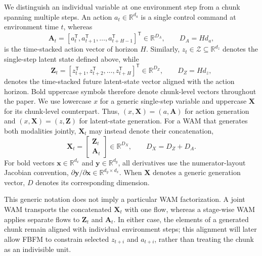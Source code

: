 We distinguish an individual variable at one environment step from a chunk spanning
multiple steps. An action
$a_t\in\mathbb{R}^{d_a}$ is a single control command at environment time $t$,
whereas
\begingroup
\small
\begin{equation}
    \mathbf{A}_t
    = [a_t^{\mathsf T},a_{t+1}^{\mathsf T},\ldots,
       a_{t+H-1}^{\mathsf T}]^{\mathsf T}
    \in\mathbb{R}^{D_A},
    \qquad D_A=H d_a,
    \label{eq:action-chunk}
\end{equation}
\endgroup
is the time-stacked action vector of horizon $H$. Similarly,
$z_t\in\mathcal{Z}\subseteq\mathbb R^{d_z}$ denotes the single-step latent state
defined above, while
\begingroup
\small
\begin{equation}
    \mathbf{Z}_t
    = [z_{t+1}^{\mathsf T},z_{t+2}^{\mathsf T},\ldots,
       z_{t+H}^{\mathsf T}]^{\mathsf T}
    \in\mathbb R^{D_Z},
    \qquad D_Z=H d_z,
    \label{eq:latent-chunk}
\end{equation}
\endgroup
denotes the time-stacked future latent-state vector aligned with the action horizon.
Bold uppercase symbols therefore denote chunk-level vectors throughout the paper.
We use
lowercase $x$ for a generic single-step variable and uppercase
$\mathbf{X}$ for its chunk-level counterpart. Thus,
$(x,\mathbf{X})=(a,\mathbf{A})$ for action generation and
$(x,\mathbf{X})=(z,\mathbf{Z})$ for latent-state generation. For a WAM that
generates both modalities jointly, $\mathbf{X}_t$ may instead denote their
concatenation,
\begin{equation}
    \mathbf{X}_t
    =
    \begin{bmatrix}
        \mathbf Z_t\\
        \mathbf A_t
    \end{bmatrix}
    \in\mathbb R^{D_X},
    \qquad D_X=D_Z+D_A.
    \label{eq:joint-wam-chunk}
\end{equation}
For bold vectors $\mathbf x\in\mathbb R^{d_x}$ and
$\mathbf y\in\mathbb R^{d_y}$, all derivatives use the numerator-layout
Jacobian convention,
$\partial\mathbf y/\partial\mathbf x\in\mathbb R^{d_y\times d_x}$.
When $\mathbf X$ denotes a generic generation vector, $D$ denotes its
corresponding dimension.

This generic notation does not imply a particular WAM factorization. A joint WAM
transports the concatenated $\mathbf{X}_t$ with one flow, whereas a stage-wise WAM
applies separate flows to $\mathbf{Z}_t$ and $\mathbf{A}_t$. In either case, the
elements of a generated chunk remain aligned with individual environment steps; this
alignment will later allow FBFM to constrain selected $z_{t+i}$ and
$a_{t+i}$, rather than treating the chunk as an indivisible unit.

